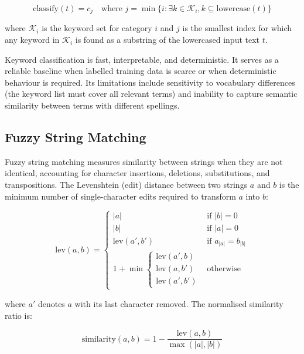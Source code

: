 \documentclass[10pt,a4paper]{article}
\begin{document}
\begin{equation}
\text{classify}(t) = c_j \quad \text{where } j = \min\{i : \exists k \in \mathcal{K}_i, k \subseteq \text{lowercase}(t)\}
\label{eq:keyword-classify}
\end{equation}

where $\mathcal{K}_i$ is the keyword set for category $i$ and $j$ is the smallest index for which any keyword in $\mathcal{K}_i$ is found as a substring of the lowercased input text $t$.

Keyword classification is fast, interpretable, and deterministic. It serves as a reliable baseline when labelled training data is scarce or when deterministic behaviour is required. Its limitations include sensitivity to vocabulary differences (the keyword list must cover all relevant terms) and inability to capture semantic similarity between terms with different spellings.

\subsection{Fuzzy String Matching}
\label{sec:fuzzy-matching}

Fuzzy string matching measures similarity between strings when they are not identical, accounting for character insertions, deletions, substitutions, and transpositions. The Levenshtein (edit) distance between two strings $a$ and $b$ is the minimum number of single-character edits required to transform $a$ into $b$:

\begin{equation}
\text{lev}(a, b) = \begin{cases}
|a| & \text{if } |b| = 0 \\
|b| & \text{if } |a| = 0 \\
\text{lev}(a', b') & \text{if } a_{|a|} = b_{|b|} \\
1 + \min\begin{cases} \text{lev}(a', b) \\
\text{lev}(a, b') \\
\text{lev}(a', b') \end{cases} & \text{otherwise}
\end{cases}
\label{eq:levenshtein}
\end{equation}

where $a'$ denotes $a$ with its last character removed. The normalised similarity ratio is:

\begin{equation}
\text{similarity}(a, b) = 1 - \frac{\text{lev}(a, b)}{\max(|a|, |b|)}
\label{eq:similarity-ratio}
\end{equation}
\end{document}
